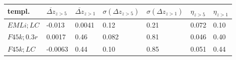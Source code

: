 \begin{tabular}{lllllll}
\toprule
templ. & $\overline{\Delta z}_{z>5}$ & $\overline{\Delta z}_{z>1}$ & $\sigma\left(\Delta z_{z>5}\right)$ & $\sigma\left(\Delta z_{z>1}\right)$ & $\eta_{z>5}$ & $\eta_{z>1}$ \\
\midrule
$EMLi;LC$ & -0.013 & 0.0041 & 0.12 & 0.21 & 0.072 & 0.10 \\
$F45k;0.3r$ & 0.0017 & 0.46 & 0.082 & 0.81 & 0.046 & 0.40 \\
$F45k;LC$ & -0.0063 & 0.44 & 0.10 & 0.85 & 0.051 & 0.44 \\
\bottomrule
\end{tabular}
